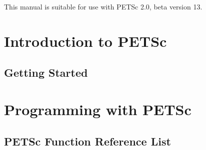 

\vspace{1in}



\vspace{1in}

\medskip \medskip 
This manual is suitable for use with PETSc 2.0, beta version 13.\\

\setcounter{page}{3}
\tableofcontents
\clearpage
{}


\part{Introduction to PETSc}
\label{part:intro}
\chapter{Getting Started}


\part{Programming with PETSc}
\label{part:usage}




\appendix

\chapter{PETSc Function Reference List}



\vfill
\eject









